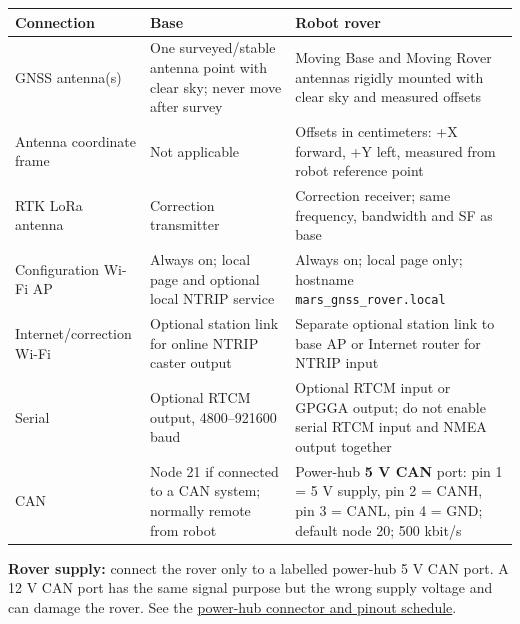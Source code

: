 \documentclass[
  10pt,
  letterpaper,
  openany]{report}
\newcounter{none} %
\begin{document}
{\def\LTcaptype{none} %
\begin{longtable}[]{@{}
  >{\raggedright\arraybackslash}p{}
  >{\raggedright\arraybackslash}p{}
  >{\raggedright\arraybackslash}p{}@{}}
\toprule\noalign{}
\begin{minipage}[b]{\linewidth}\raggedright
Connection
\end{minipage} & \begin{minipage}[b]{\linewidth}\raggedright
Base
\end{minipage} & \begin{minipage}[b]{\linewidth}\raggedright
Robot rover
\end{minipage} \\
\midrule\noalign{}
\endhead
\bottomrule\noalign{}
\endlastfoot
GNSS antenna(s) & One surveyed/stable antenna point with clear sky;
never move after survey & Moving Base and Moving Rover antennas rigidly
mounted with clear sky and measured offsets \\
Antenna coordinate frame & Not applicable & Offsets in centimeters: +X
forward, +Y left, measured from robot reference point \\
RTK LoRa antenna & Correction transmitter & Correction receiver; same
frequency, bandwidth and SF as base \\
Configuration Wi-Fi AP & Always on; local page and optional local NTRIP
service & Always on; local page only; hostname
\texttt{mars\_gnss\_rover.local} \\
Internet/correction Wi-Fi & Optional station link for online NTRIP
caster output & Separate optional station link to base AP or Internet
router for NTRIP input \\
Serial & Optional RTCM output, 4800--921600 baud & Optional RTCM input
or GPGGA output; do not enable serial RTCM input and NMEA output
together \\
CAN & Node 21 if connected to a CAN system; normally remote from robot &
Power-hub \textbf{5 V CAN} port: pin 1 = 5 V supply, pin 2 = CANH, pin 3
= CANL, pin 4 = GND; default node 20; 500 kbit/s \\
\end{longtable}
}

\begin{manualwarning}

\textbf{Rover supply:} connect the rover only to a labelled power-hub 5
V CAN port. A 12 V CAN port has the same signal purpose but the wrong
supply voltage and can damage the rover. See the
\hyperref[power-hub-ports]{power-hub connector and pinout schedule}.

\end{manualwarning}
\end{document}
